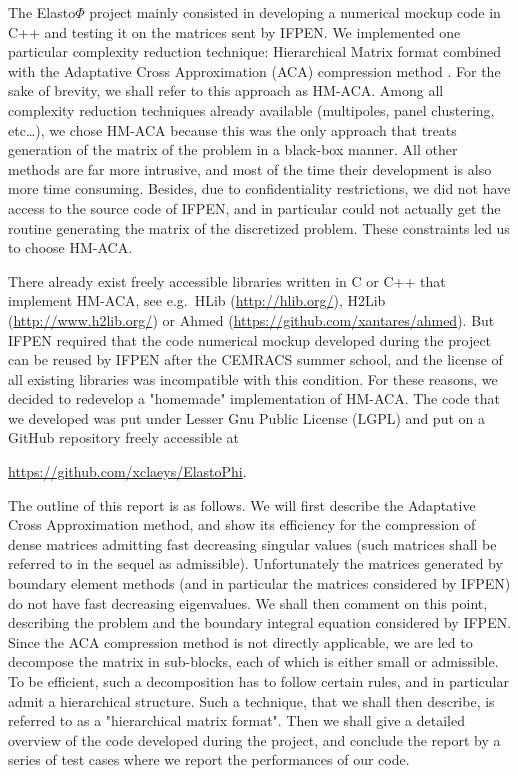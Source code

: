 \bigskip
The Elasto$\Phi$ project mainly consisted in developing a numerical mockup code in C++ and testing it on the matrices sent 
by IFPEN. We implemented one particular complexity reduction technique: Hierarchical Matrix \cite{Hackbusch2016} format combined with the Adaptative Cross 
Approximation (ACA) compression method \cite{Bebendorf2008}. For the sake of brevity, we shall refer to this approach as HM-ACA. 
Among all complexity reduction techniques 
already available (multipoles, panel clustering, etc\dots), we chose HM-ACA because this was the only approach that treats generation 
of the matrix of the problem in a black-box manner. All other methods are far more intrusive, and most of the time their development 
is also more time consuming. Besides, due to confidentiality restrictions, we did not have access to the source code of IFPEN, and 
in particular could not actually get the routine generating the matrix of the discretized problem. These constraints led us to choose HM-ACA.

\bigskip
There already exist freely accessible libraries written in C or C++ that implement HM-ACA, see e.g.~HLib (\url{http://hlib.org/}), H2Lib 
(\url{http://www.h2lib.org/}) or Ahmed (\url{https://github.com/xantares/ahmed}). But IFPEN required 
that the code numerical mockup developed during the project can be reused by IFPEN after the CEMRACS summer school, 
and the license of all existing libraries was incompatible with this condition. For these reasons, we decided to redevelop 
a "homemade" implementation of HM-ACA. The code that we developed was put under Lesser Gnu Public License (LGPL) and 
put on a GitHub repository freely accessible at
\begin{center}
\url{https://github.com/xclaeys/ElastoPhi}.
\end{center}

\medskip
The outline of this report is as follows. We will first describe the Adaptative Cross Approximation method, and show its efficiency 
for the compression of dense matrices admitting fast decreasing singular values (such matrices shall be referred to in the sequel as admissible). 
Unfortunately the matrices generated by boundary element  methods (and in particular the matrices considered by IFPEN) do not have 
fast decreasing eigenvalues. We shall then comment on this point, describing the problem and the boundary integral equation 
considered by IFPEN. Since the ACA compression method is not directly applicable, we are led to decompose the matrix in sub-blocks, 
each of which is either small or admissible. To be efficient, such a decomposition has to follow certain rules, and in particular 
admit a hierarchical structure. Such a technique, that we shall then describe, is referred to as a "hierarchical matrix format". 
Then we shall give a detailed overview of the code developed during the project, and conclude the report by a series of test 
cases where we report the performances of our code.

